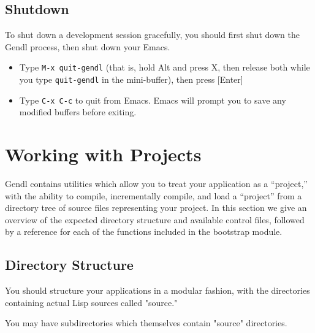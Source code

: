 \documentclass [11pt]{book}
\begin{document}
\subsection{Shutdown}

\label{subsec:shutdown}

 To shut down a development session gracefully, you should first shut down the Gendl process,
then shut down your Emacs.

\begin{itemize}

\item Type \texttt{M-x quit-gendl} (that is, hold Alt and press X, then release both while you type \texttt{quit-gendl} in the mini-buffer), then press [Enter]

\item Type \texttt{C-x C-c} to quit from Emacs. Emacs will prompt you to save any modified buffers before exiting.

\end{itemize}



\section{Working with Projects}

\label{sec:workingwithprojects}

Gendl contains utilities which allow you to treat your
application as a ``project,'' with the ability to compile,
incrementally compile, and load a ``project'' from a directory tree of
source files representing your project. In this section we give an
overview of the expected directory structure and available control
files, followed by a reference for each of the functions included in
the bootstrap module.

\subsection{Directory Structure}

\label{subsec:directorystructure}



You should structure your applications in a modular fashion, with the
directories containing actual Lisp sources called "source."



You may have subdirectories which themselves contain "source"
directories.
\end{document}
